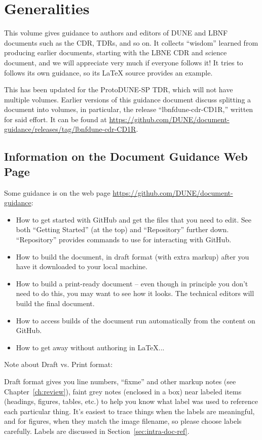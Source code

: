 \chapter{Generalities}
\label{ch:generalities}

This volume gives guidance to authors and editors of DUNE and LBNF documents such as the CDR, TDRs, and so on. It collects ``wisdom'' learned from 
producing earlier documents, starting with the LBNE CDR and science document, and we will appreciate 
very much if everyone follows it!  It tries to follows its own guidance, so its \LaTeX{} source
provides an example.  

This has been updated for the ProtoDUNE-SP TDR, which will not have multiple volumes. Earlier versions of this guidance document discuss splitting a document into volumes, in particular, the release ``lbnfdune-cdr-CD1R,'' written for said effort.  It can be found at \url{https://github.com/DUNE/document-guidance/releases/tag/lbnfdune-cdr-CD1R}.


\section{Information on the Document Guidance Web Page}
\label{ssec:files-webpage}

Some guidance is on the web page \url{https://github.com/DUNE/document-guidance}:

\begin{itemize}
\item How to get started with GitHub and get the files that you need to edit. See both ``Getting Started'' (at the top) and ``Repository'' further down.  ``Repository'' provides commands to use for interacting with GitHub.
\item How to build the document, in draft format (with extra markup) after you have it downloaded to your local machine.
\item How to build a print-ready document -- even though in principle you don't need to do this, you may want to see how it looks. The technical editors will build the final document.
\item How to access builds of the document run automatically from the content on GitHub.
\item How to get away without authoring in \LaTeX{}...
\end{itemize}

Note about Draft vs. Print format: 

Draft format gives you line numbers, ``fixme'' and other markup notes (see Chapter~\ref{ch:review}), 
faint grey notes (enclosed in a box) near labeled items (headings, figures, tables, etc.) to help you know 
what label was used to reference each particular thing.  
It's easiest to trace things when the labels are meaningful, and for figures, when they match the image filename, so please choose labels carefully. Labels are discussed in Section~\ref{sec:intra-doc-ref}.

